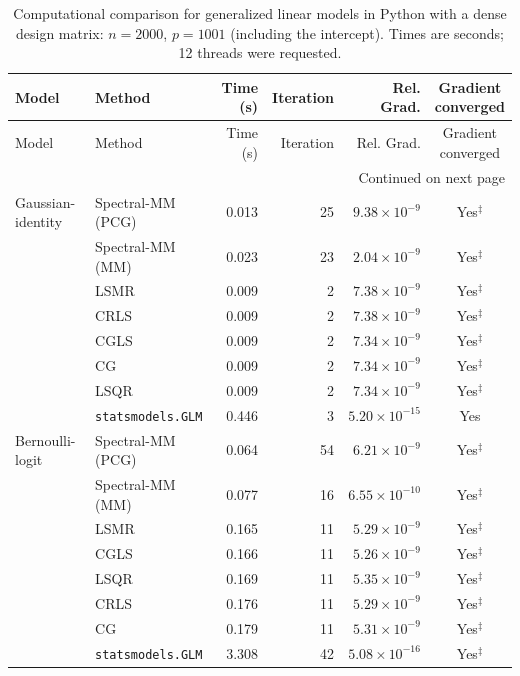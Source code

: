 \documentclass[10pt,a4paper]{article}
\begin{document}
\begingroup
\small
\setlength{\tabcolsep}{4pt}
\begin{longtable}{llrrrc}
\caption{Computational comparison for generalized linear models in Python with a dense design matrix: $n=2000$, $p=1001$ (including the intercept). Times are seconds; 12 threads were requested.}
\label{tab:python-dense-glm-initial}\\
\toprule
Model & Method & Time (s) & Iteration & Rel. Grad. & \shortstack{Gradient\\converged} \\
\midrule
\endfirsthead
\toprule
Model & Method & Time (s) & Iteration & Rel. Grad. & \shortstack{Gradient\\converged} \\
\midrule
\endhead
\midrule
\multicolumn{6}{r}{Continued on next page}\\
\endfoot
\bottomrule
\endlastfoot
Gaussian-identity & Spectral-MM (PCG) & 0.013 & 25 & $9.38\times10^{-9}$ & Yes$^{\ddagger}$ \\
 & Spectral-MM (MM) & 0.023 & 23 & $2.04\times10^{-9}$ & Yes$^{\ddagger}$ \\
 & LSMR & 0.009 & 2 & $7.38\times10^{-9}$ & Yes$^{\ddagger}$ \\
 & CRLS & 0.009 & 2 & $7.38\times10^{-9}$ & Yes$^{\ddagger}$ \\
 & CGLS & 0.009 & 2 & $7.34\times10^{-9}$ & Yes$^{\ddagger}$ \\
 & CG & 0.009 & 2 & $7.34\times10^{-9}$ & Yes$^{\ddagger}$ \\
 & LSQR & 0.009 & 2 & $7.34\times10^{-9}$ & Yes$^{\ddagger}$ \\
 & \texttt{statsmodels.GLM} & 0.446 & 3 & $5.20\times10^{-15}$ & Yes \\
\midrule
Bernoulli-logit & Spectral-MM (PCG) & 0.064 & 54 & $6.21\times10^{-9}$ & Yes$^{\ddagger}$ \\
 & Spectral-MM (MM) & 0.077 & 16 & $6.55\times10^{-10}$ & Yes$^{\ddagger}$ \\
 & LSMR & 0.165 & 11 & $5.29\times10^{-9}$ & Yes$^{\ddagger}$ \\
 & CGLS & 0.166 & 11 & $5.26\times10^{-9}$ & Yes$^{\ddagger}$ \\
 & LSQR & 0.169 & 11 & $5.35\times10^{-9}$ & Yes$^{\ddagger}$ \\
 & CRLS & 0.176 & 11 & $5.29\times10^{-9}$ & Yes$^{\ddagger}$ \\
 & CG & 0.179 & 11 & $5.31\times10^{-9}$ & Yes$^{\ddagger}$ \\
 & \texttt{statsmodels.GLM} & 3.308 & 42 & $5.08\times10^{-16}$ & Yes$^{\ddagger}$ \\

\end{longtable}
\end{document}
